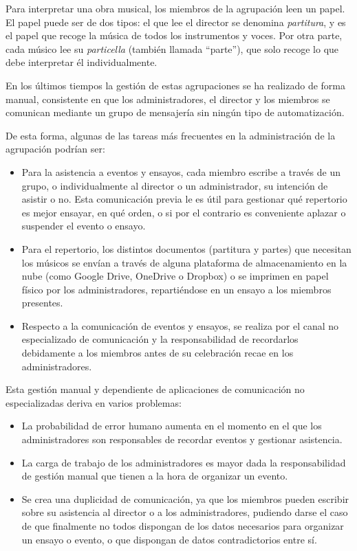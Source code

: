 Para interpretar una obra musical, los miembros de la agrupación leen un papel. El papel puede ser de dos tipos: el que lee el director se denomina \textit{partitura}, y es el papel que recoge la música de todos los instrumentos y voces. Por otra parte, cada músico lee su \textit{particella} (también llamada ``parte''), que solo recoge lo que debe interpretar él individualmente.

En los últimos tiempos la gestión de estas agrupaciones se ha realizado de forma manual, consistente en que los administradores, el director y los miembros se comunican mediante un grupo de mensajería sin ningún tipo de automatización.

De esta forma, algunas de las tareas más frecuentes en la administración de la agrupación podrían ser:

\begin{itemize}
    \item Para la asistencia a eventos y ensayos, cada miembro escribe a través de un grupo, o individualmente al director o un administrador, su intención de asistir o no. Esta comunicación previa le es útil para gestionar qué repertorio es mejor ensayar, en qué orden, o si por el contrario es conveniente aplazar o suspender el evento o ensayo.
    \item Para el repertorio, los distintos documentos (partitura y partes) que necesitan los músicos se envían a través de alguna plataforma de almacenamiento en la nube (como Google Drive, OneDrive o Dropbox) o se imprimen en papel físico por los administradores, repartiéndose en un ensayo a los miembros presentes.
    \item Respecto a la comunicación de eventos y ensayos, se realiza por el canal no especializado de comunicación y la responsabilidad de recordarlos debidamente a los miembros antes de su celebración recae en los administradores.
\end{itemize}

Esta gestión manual y dependiente de aplicaciones de comunicación no especializadas deriva en varios problemas:

\begin{itemize}
    \item La probabilidad de error humano aumenta en el momento en el que los administradores son responsables de recordar eventos y gestionar asistencia.
    \item La carga de trabajo de los administradores es mayor dada la responsabilidad de gestión manual que tienen a la hora de organizar un evento.
    \item Se crea una duplicidad de comunicación, ya que los miembros pueden escribir sobre su asistencia al director o a los administradores, pudiendo darse el caso de que finalmente no todos dispongan de los datos necesarios para organizar un ensayo o evento, o que dispongan de datos contradictorios entre sí.
\end{itemize}

